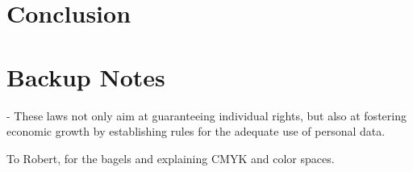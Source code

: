 \documentclass[sigconf]{acmart}
\begin{document}
\section{Conclusion}


\section{Backup Notes}
- These laws not only aim at guaranteeing individual rights, but also at fostering economic growth by establishing rules for the adequate use of personal data.

%
\begin{acks}
To Robert, for the bagels and explaining CMYK and color spaces.
\end{acks}

%


\end{document}

